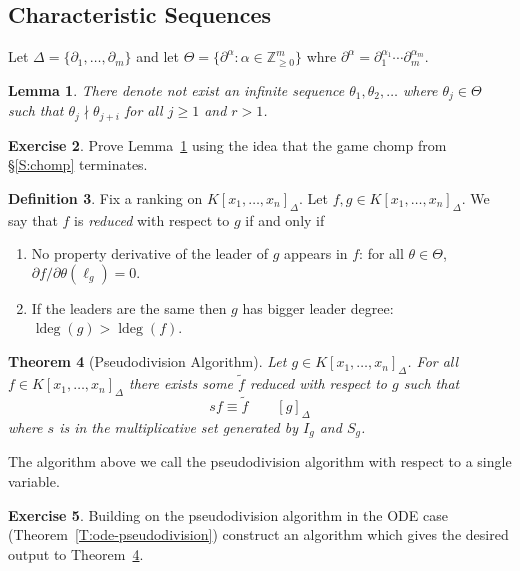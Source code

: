 \documentclass[12pt]{book}
\numberwithin{equation}{section}
\newtheorem{theorem}{Theorem}[subsection]
\newtheorem{lemma}[theorem]{Lemma}
\theoremstyle{definition}
\newtheorem{definition}[theorem]{Definition}
\newtheorem{exercise}[theorem]{Exercise}
\theoremstyle{remark}
\newcommand{\ZZ}{\mathbb{Z}}
\newcommand{\ldeg}{\operatorname{ldeg}}
\begin{document}
\subsection{Characteristic Sequences}
Let $\Delta = \lbrace \partial_1,\ldots,\partial_m\rbrace$ and let $\Theta = \lbrace \partial^{\alpha} \colon \alpha \in \ZZ_{\geq 0}^m\rbrace$ whre $\partial^{\alpha} = \partial_1^{\alpha_1} \cdots \partial_m^{\alpha_m}$. 

\begin{lemma}\label{L:dickson}
	There denote not exist an infinite sequence $\theta_1,\theta_2,\ldots$ where $\theta_j \in \Theta$ such that $\theta_j \nmid \theta_{j+i}$ for all $j\geq 1$ and $r>1$. 
\end{lemma}

\begin{exercise}
	Prove Lemma~\ref{L:dickson} using the idea that the game chomp from \S\ref{S:chomp} terminates. 
\end{exercise}

\begin{definition}
Fix a ranking on $K[x_1,\ldots,x_n]_{\Delta}$. 
Let $f,g \in K[x_1,\ldots,x_n]_{\Delta}$.
We say that $f$ is \emph{reduced} with respect to $g$ if and only if 
\begin{enumerate}[topsep=0pt]
	\item No property derivative of the leader of $g$ appears in $f$: for all $\theta \in \Theta$, $\partial f/\partial \theta(\ell_g) =0.$
	\item If the leaders are the same then $g$ has bigger leader degree: $\ldeg(g) > \ldeg(f)$.
\end{enumerate}
\end{definition}

\begin{theorem}[Pseudodivision Algorithm]\label{T:pde-pseudodivision}
	Let $g \in K[x_1,\ldots,x_n]_{\Delta}$. 
	For all $f \in K[x_1,\ldots,x_n]_{\Delta}$ there exists some $\widetilde{f}$ reduced with respect to $g$ such that
	 $$ s f \equiv \widetilde{f} \qquad [g]_{\Delta} $$
	where $s$ is in the multiplicative set generated by $I_g$ and $S_g$.
\end{theorem}

The algorithm above we call the pseudodivision algorithm with respect to a single variable. 

\begin{exercise}
	Building on the pseudodivision algorithm in the ODE case (Theorem~\ref{T:ode-pseudodivision}) construct an algorithm which gives the desired output to Theorem~\ref{T:pde-pseudodivision}.
\end{exercise}
\end{document}
